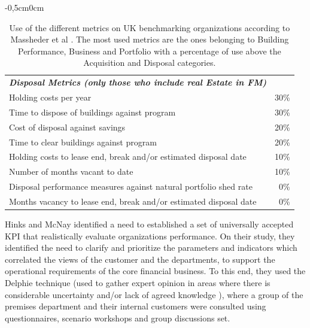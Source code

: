 \begin{table}[h!]
\begin{adjustwidth}{-0,5cm}{0cm}
\begin{tabular}{l r}
		{\bf {\emph{Disposal Metrics (only those who include real Estate in FM)}}} & \\
		Holding costs per year &  30\% \\
		 Time to dispose of buildings against program &  30\% \\
		 Cost of disposal against savings &  20\% \\ 
		Time to clear buildings against program  &  20\% \\ 
		 Holding costs to lease end, break and/or estimated disposal date & 10\% \\ 
		 Number of months vacant to date &  10\% \\ 
		 Disposal performance measures against natural portfolio shed rate & 0\% \\ 
		 Months vacancy to lease end, break and/or estimated disposal date &  0\% \\ 
		\hline

	\end{tabular}
	\end{adjustwidth}
\caption{Use of the different metrics on UK benchmarking organizations according to Massheder et al \cite{Mass1998}. The most used metrics are the ones belonging to Building Performance, Business and Portfolio with a percentage of use above the Acquisition and Disposal categories.}
\label{tb:TableUseBenchmarkingMetrics}
\end{table}



Hinks and McNay \cite{Hinks1999} identified a need to established a set of universally accepted KPI that realistically evaluate organizations performance.  
On their study, they identified the need to clarify and prioritize the parameters and indicators which correlated the views of the customer and the departments, to support the operational requirements of the core financial business. To this end, they used the Delphie technique \cite{Eynde1997} (used to gather expert opinion in areas where there is considerable uncertainty and/or lack of agreed knowledge \cite{Hinks1999}), where a group of the premises department and their internal customers were consulted using questionnaires, scenario workshops and group discussions set.

